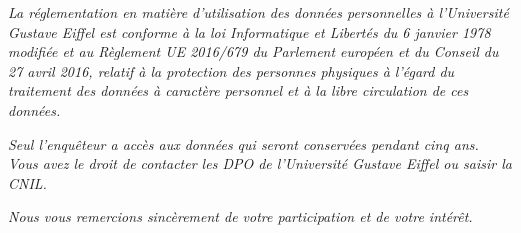 \textsl{La réglementation en matière d'utilisation des données personnelles à l'Université Gustave Eiffel est conforme à la loi Informatique et Libertés du 6 janvier 1978 modifiée et au Règlement UE 2016/679 du Parlement européen et du Conseil du 27 avril 2016, relatif à la protection des personnes physiques à l'égard du traitement des données à caractère personnel et à la libre circulation de ces données.}%

\textsl{Seul l'enquêteur a accès aux données qui seront conservées pendant cinq ans. Vous avez le droit de contacter les \acrfull{DPO} de l’Université Gustave Eiffel ou saisir la \acrfull{CNIL}.}%

\textsl{Nous vous remercions sincèrement de votre participation et de votre intérêt.}%

